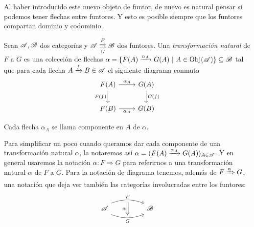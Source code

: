 \documentclass{comunicaciones}
\begin{document}
Al haber introducido este nuevo objeto de funtor, de nuevo es natural pensar si podemos tener flechas entre funtores. Y esto es posible siempre que los funtores
compartan dominio y codominio.

\begin{dfn}
    Sean $\mathscr A,\mathscr B$ dos categorías y $\mathscr A\overset{F}{\underset{G}{\rightrightarrows}}\mathscr B$ dos funtores. Una \emph{transformación natural} de $F$ a $G$
    es una colección de flechas $\alpha=\{F(A)\xrightarrow{\alpha_A}G(A) \ |\ A\in\Obj(\A)\}\subseteq\B$ tal que para cada flecha $A\xrightarrow{f}B\in\mathscr A$ el siguiente diagrama conmuta
    \[\begin{tikzcd}
        {F(A)} & {G(A)} \\
        {F(B)} & {G(B)}
        \arrow["{\alpha_A}", from=1-1, to=1-2]
        \arrow["{F(f)}"', from=1-1, to=2-1]
        \arrow["{G(f)}", from=1-2, to=2-2]
        \arrow["{\alpha_B}"', from=2-1, to=2-2]
    \end{tikzcd}\]

    Cada flecha $\alpha_A$ se llama componente en $A$ de $\alpha$.
\end{dfn}

Para simplificar un poco cuando queramos dar cada componente de una transformación natural $\alpha$, la notaremos así $\alpha=(F(A)\xrightarrow{\alpha_A}G(A))_{A\in\mathscr A}$.
Y en general usaremos la notación $\alpha:F\Rightarrow G$ para referirnos a una transformación natural $\alpha$ de $F$ a $G$. Para la notación de diagrama tenemos, además
de $F\xRightarrow{\alpha}G$, una notación que deja ver también las categorías involucradas entre los funtores:
\[
\begin{tikzcd}
	\A && \B
	\arrow[""{name=0, anchor=center, inner sep=0}, "F", shift left=2, out=20, in=160, from=1-1, to=1-3]
	\arrow[""{name=1, anchor=center, inner sep=0}, "G"', shift right=2, out=340, in=200, from=1-1, to=1-3]
	\arrow["\alpha"', shorten <=3pt, shorten >=3pt, Rightarrow, from=0, to=1]
\end{tikzcd}
\]
\end{document}
